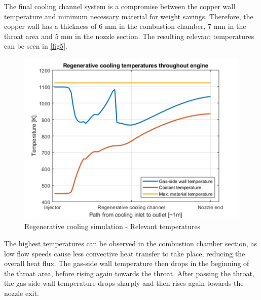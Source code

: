 The final cooling channel system is a compromise between the copper wall temperature and minimum necessary material for weight savings. Therefore, the copper wall has a thickness of $6$ mm in the combustion chamber, $7$ mm in the throat area and $5$ mm in the nozzle section. The resulting relevant temperatures can be seen in \autoref{fig5}.

\begin{figure}[H]
	\centering\includegraphics[width=0.9\linewidth]{relevanttemps}
	\caption{Regenerative cooling simulation - Relevant temperatures}\label{fig5}
\end{figure}

The highest temperatures can be observed in the combustion chamber section, as low flow speeds cause less convective heat transfer to take place, reducing the overall heat flux. The gas-side wall temperature then drops in the beginning of the throat area, before rising again towards the throat. After passing the throat, the gas-side wall temperature drops sharply and then rises again towards the nozzle exit.
